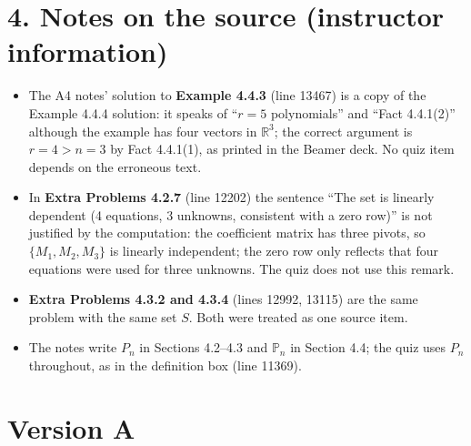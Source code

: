 \documentclass[11pt,a4paper]{article}
\begin{document}
\section*{4. Notes on the source (instructor information)}
\begin{itemize}[leftmargin=5mm,itemsep=1pt]
\item The A4 notes' solution to \textbf{Example 4.4.3} (line 13467) is a copy of the Example 4.4.4 solution: it speaks of ``$r=5$ polynomials'' and ``Fact 4.4.1(2)'' although the example has four vectors in $\mathbb{R}^3$; the correct argument is $r=4>n=3$ by Fact 4.4.1(1), as printed in the Beamer deck. No quiz item depends on the erroneous text.
\item In \textbf{Extra Problems 4.2.7} (line 12202) the sentence ``The set is linearly dependent (4 equations, 3 unknowns, consistent with a zero row)'' is not justified by the computation: the coefficient matrix has three pivots, so $\{M_1,M_2,M_3\}$ is linearly independent; the zero row only reflects that four equations were used for three unknowns. The quiz does not use this remark.
\item \textbf{Extra Problems 4.3.2 and 4.3.4} (lines 12992, 13115) are the same problem with the same set $S$. Both were treated as one source item.
\item The notes write $P_n$ in Sections 4.2--4.3 and $\mathbb{P}_n$ in Section 4.4; the quiz uses $P_n$ throughout, as in the definition box (line 11369).
\end{itemize}
\clearpage\section*{Version A}
\end{document}
